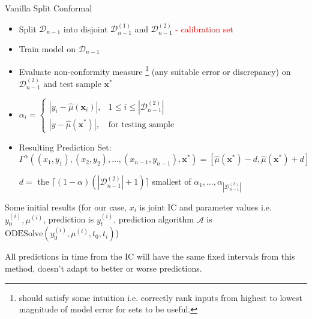 \documentclass[usenames,dvipsnames]{beamer}
\theoremstyle{definition}
\begin{document}
\begin{frame}{Vanilla Split Conformal}

\begin{itemize}
\item Split $\mathcal{D}_{n-1}$ into disjoint $\mathcal{D}_{n-1}^{(1)}$ and $\mathcal{D}_{n-1}^{(2)}$ \textcolor{red}{ - calibration set}

\item Train model on $\mathcal{D}_{n-1}$

\item Evaluate non-conformity measure \footnote{should satisfy some intuition i.e. correctly rank inputs from highest to lowest magnitude of model error for sets to be useful.} (any suitable error or discrepancy) on $\mathcal{D}_{n-1}^{(2)}$ and test sample $\mathbf{x}^{\ast}$

\item $\alpha_i=\begin{cases}|y_i-\widehat{\mu}(\mathbf{x}_i)|,&1\le i\le|\mathcal{D}_{n-1}^{(2)}|\\|y-\widehat{\mu}(\mathbf{x}^{\ast})|,&\text{for testing sample}\end{cases}$

\item Resulting Prediction Set:
$\Gamma^{\alpha}((x_{1}, y_1),(x_{2}, y_2),\ldots,(x_{n-1}, y_{n-1}), \mathbf{x^{\ast}}) = [\widehat{\mu}(\mathbf{x}^*)-d,\widehat{\mu}(\mathbf{x}^*)+d]$

$d=$ the $\lceil(1-\alpha)(|\mathcal{D}_{n-1}^{(2)}|+1)\rceil$ smallest of $\alpha_{1},\ldots,\alpha_{|\mathcal{D}_{n-1}^{(2)}|}$
\end{itemize}
\end{frame}

\begin{frame}{Some initial results}
(for our case, $x_i$ is joint IC and parameter values i.e. $y_0^{(i)}, \mu^{(i)}$, prediction is $y_t^{(i)}$, prediction algorithm $\mathcal{A}$ is $\textrm{ODESolve}(y_0^{(i)}, \mu^{(i)}, t_0, t_i)$)

\pause

All predictions in time from the IC will have the same fixed intervals from this method, doesn't adapt to better or worse predictions.

\end{frame}
\end{document}
